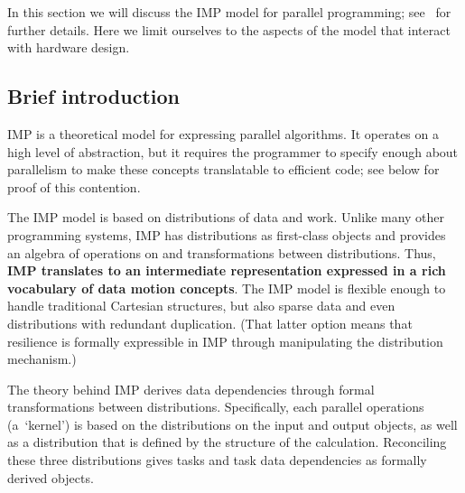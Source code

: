 In this section we will discuss the  \acf{IMP} model for parallel programming;
see~\cite{Eijkhout:ICCS2012,Eijkhout:hips2014}
for further details. Here we limit ourselves to the aspects of the model that
interact with hardware design.

\subsection{Brief introduction}

\ac{IMP} is a theoretical model for expressing parallel algorithms.
It operates on a high level of abstraction, but it requires the programmer
to specify enough about parallelism to make these concepts 
translatable to efficient code; see below for proof of this contention.

The \ac{IMP} model
is based on distributions of data and work. Unlike many other programming systems,
\ac{IMP} has distributions as first-class objects and provides an algebra
of operations on and transformations between distributions. Thus,
\textbf{IMP translates to an intermediate representation 
expressed in a rich vocabulary of data motion concepts}.
The \ac{IMP} model is flexible enough
to handle traditional Cartesian structures, but also sparse data
and even distributions with redundant duplication. (That latter option
means that resilience is formally expressible in \ac{IMP} through
manipulating the distribution mechanism.)

The theory behind \ac{IMP} derives data dependencies 
through formal transformations between distributions.
Specifically, each parallel operations (a~`kernel')
is based on the distributions on the input and output objects,
as well as a distribution that is defined by the structure
of the calculation. Reconciling these three distributions
gives tasks and task data dependencies as formally 
derived objects.

